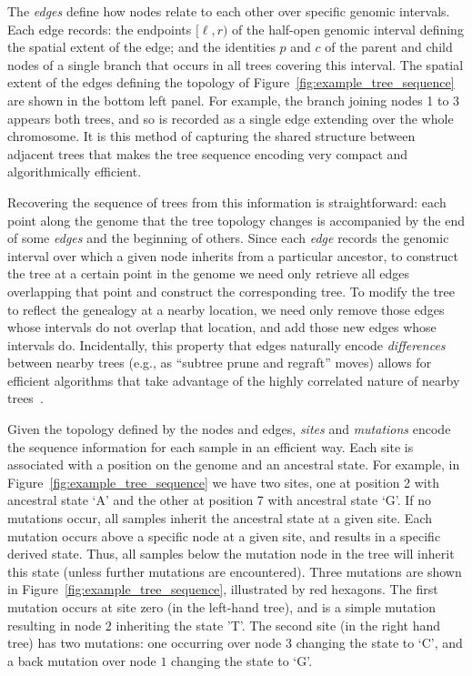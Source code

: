 \documentclass{article}
\begin{document}
The \emph{edges} define how nodes relate to each other over specific genomic intervals. 
Each edge records: 
the endpoints $[\ell, r)$ of the half-open genomic interval defining the
spatial extent of the edge; 
and the identities $p$ and $c$ of the parent and child nodes
of a single branch that occurs in all trees covering this interval.
The spatial extent of the edges defining the topology of Figure~\ref{fig:example_tree_sequence}
are shown in the bottom left panel. 
For example, the branch joining nodes 1 to 3 appears both trees,
and so is recorded as a single edge extending over the whole chromosome. 
It is this method of capturing the shared structure between adjacent trees that makes the
tree sequence encoding very compact and algorithmically efficient.

Recovering the sequence of trees from this information is straightforward:
each point along the genome that the tree topology changes
is accompanied by the end of some \emph{edges} and the beginning of others.
Since each \emph{edge} records the genomic interval 
over which a given node inherits from a particular ancestor,
to construct the tree at a certain point in the genome
we need only retrieve all edges overlapping that point
and construct the corresponding tree.
To modify the tree to reflect the genealogy at a nearby location,
we need only remove those edges whose intervals do not overlap that location,
and add those new edges whose intervals do.
Incidentally, this property that edges naturally encode \emph{differences}
between nearby trees (e.g., as ``subtree prune and regraft'' moves)
allows for efficient algorithms that take advantage
of the highly correlated nature of nearby trees~\citep{kelleher2016efficient}.

Given the topology defined by the nodes and edges, \emph{sites} and \emph{mutations}
encode the sequence information for each sample in an efficient way. Each site
is associated with a position on the genome and an ancestral state. For example,
in Figure~\ref{fig:example_tree_sequence} we have two sites, one at position
2 with ancestral state `A' and the other at position 7 with ancestral state `G'. If
no mutations occur, all samples inherit the ancestral state at a given site.
Each mutation occurs above a specific node at a given site, 
and results in a specific derived state. 
Thus, all samples below the mutation node in the tree will inherit this state 
(unless further mutations are encountered). 
Three mutations are shown in Figure~\ref{fig:example_tree_sequence}, 
illustrated by red hexagons. 
The first mutation occurs at site zero (in the left-hand tree), and is a simple
mutation resulting in node $2$ inheriting the state 'T'. 
The second site (in the right hand tree) has two mutations: 
one occurring over node $3$ changing the state to `C', 
and a back mutation over node $1$ changing the state to `G'.
\end{document}
